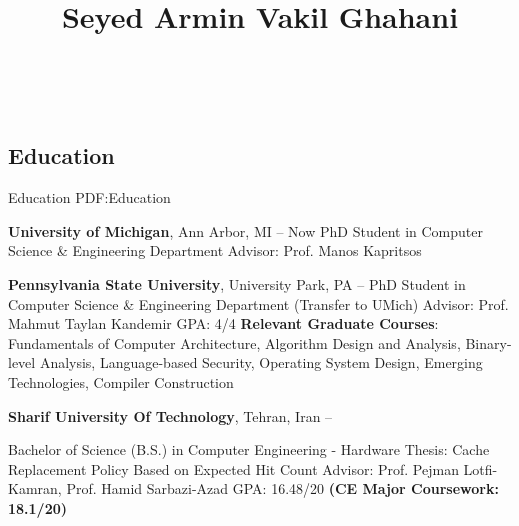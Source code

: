 \documentclass[a4paper,9pt,oneside]{article}
\newcommand{\CVAuthor}{Seyed Armin Vakil Ghahani}
\begin{document}

\title{\CVAuthor}
\begin{subtitle}

\Large{
\href{https://arminvakil.github.io/}{\faGlobe}
\href{mailto:arminvakil@gmail.com}{\faEnvelope}
\href{https://www.linkedin.com/in/arminvakil}{\faLinkedinSquare}
\href{https://github.com/arminvakil}{\faGithubSquare}
\href{https://scholar.google.com/citations?user=OHnTCysAAAAJ&hl=en}{\faGraduationCap}}
\
\end{subtitle}

\begin{body}


\section
{Education}
{Education}
{PDF:Education}

\textbf{University of Michigan},
Ann Arbor, MI
\hfill
{} --
Now
\GapNoBreak
\BulletItem
PhD Student in
	Computer Science \& Engineering Department
\SubBulletItem
Advisor: Prof. Manos Kapritsos

\textbf{Pennsylvania State University},
University Park, PA
\hfill
{} --
\GapNoBreak
\BulletItem
PhD Student in
	Computer Science \& Engineering Department (Transfer to UMich)
\SubBulletItem
Advisor: Prof. Mahmut Taylan Kandemir
\SubBulletItem
GPA: 4/4
\SubBulletItem
\textbf{Relevant Graduate Courses}: Fundamentals of Computer Architecture, Algorithm Design and Analysis, Binary-level Analysis, Language-based Security, Operating System Design, Emerging Technologies, Compiler Construction

\BigGap

\textbf{Sharif University Of Technology},
Tehran, Iran
\hfill
{} --

\GapNoBreak
\BulletItem
Bachelor of Science (B.S.) in
Computer Engineering - Hardware
\SubBulletItem
Thesis: Cache Replacement Policy Based on Expected Hit Count
\newline
Advisor: Prof. Pejman Lotfi-Kamran, Prof. Hamid Sarbazi-Azad
\SubBulletItem
GPA: 16.48/20 \textbf{(CE Major Coursework: 18.1/20)}



\end{body}
\end{document}
